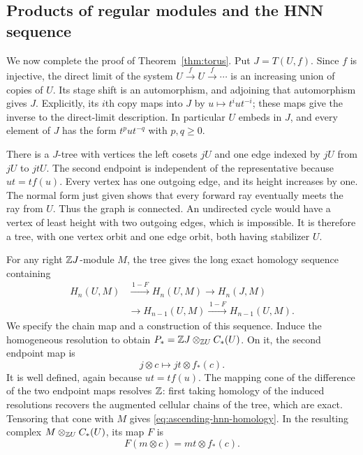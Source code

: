 \subsection{Products of regular modules and the HNN sequence}

We now complete the proof of Theorem~\ref{thm:torus}.  Put
$J=T(U,f)$.  Since $f$ is injective, the direct limit of the system
$U\xrightarrow f U\xrightarrow f\cdots$ is an increasing union of
copies of $U$.  Its stage shift is an automorphism, and adjoining
that automorphism gives $J$.  Explicitly, its $i$th copy maps into
$J$ by $u\mapsto t^iut^{-i}$; these maps give the inverse to the
direct-limit description.  In particular $U$ embeds in $J$, and
every element of $J$ has the form $t^p u t^{-q}$ with $p,q\ge0$.

There is a $J$-tree with vertices the left cosets $jU$ and one edge
indexed by $jU$ from $jU$ to $jtU$.  The second endpoint is independent
of the representative because $ut=tf(u)$.  Every vertex has one
outgoing edge, and its height increases by one.  The normal form just
given shows that every forward ray eventually meets the ray from
$U$.  Thus the graph is connected.  An undirected cycle would have a
vertex of least height with two outgoing edges, which is impossible.
It is therefore a tree, with one vertex orbit and one edge orbit,
both having stabilizer $U$.

For any right $\mathbb Z J$-module $M$, the tree gives the long exact
homology sequence containing
\begin{equation}\label{eq:ascending-hnn-homology}
 \begin{split}
 H_n(U,M)&\xrightarrow{\,1-F\,}H_n(U,M)
       \longrightarrow H_n(J,M)\\
       &\longrightarrow H_{n-1}(U,M)
          \xrightarrow{\,1-F\,}H_{n-1}(U,M).
 \end{split}
\end{equation}
We specify the chain map and a construction of this sequence.
Induce the homogeneous resolution to obtain
$P_* =\mathbb Z J\otimes_{\mathbb Z U}C_*(U)$.  On it, the second endpoint map is
\[
 j\otimes c\longmapsto jt\otimes f_*(c).
\]
It is well defined, again because $ut=tf(u)$.  The mapping cone of
the difference of the two endpoint maps resolves $\mathbb Z$: first taking
homology of the induced resolutions recovers the augmented cellular
chains of the tree, which are exact.  Tensoring that cone with $M$
gives \eqref{eq:ascending-hnn-homology}.  In the resulting complex
$M\otimes_{\mathbb Z U}C_*(U)$, its map $F$ is
\begin{equation}\label{eq:coefficient-shift}
 F(m\otimes c)=mt\otimes f_*(c).
\end{equation}

